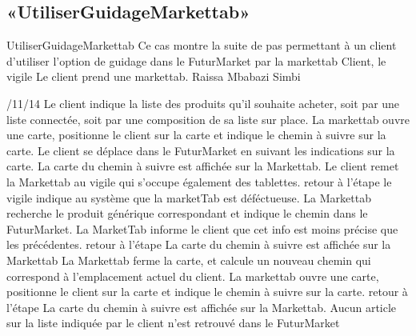 \subsection{«UtiliserGuidageMarkettab»}
\startCU
\nom UtiliserGuidageMarkettab
\but Ce cas montre la suite de pas permettant à un client d'utiliser l'option de guidage dans le FuturMarket par la markettab
\acteur Client, le vigile
\precondition Le client prend une markettab.
\auteur Raissa Mbabazi Simbi
\date 7/11/14
\nominal %
\startnominal
{} Le client indique la liste des produits qu'il souhaite acheter, soit par une liste connectée, soit par une composition de sa liste sur place.
\etape[UGM:SE1] La markettab ouvre une carte, positionne le client sur la carte et indique le chemin à suivre sur la carte.
 Le client se déplace dans le FuturMarket en suivant les indications sur la carte.
\stopnominal
\postcondition La carte du chemin à suivre est affichée sur la Markettab.
\alternatifs
{}
\etape Le client remet la Markettab au vigile qui s'occupe également des tablettes.
\etape retour à l'étape 
\stopcondition
\postcondition le vigile indique au système que la marketTab est déféctueuse.
\stopalternatif
\startalternatif[UGM:SE1]
\etape La Markettab recherche le produit générique correspondant et indique le chemin dans le FuturMarket. La MarketTab informe le client que cet info est moins précise que les précédentes.
\etape retour à l'étape 
\stopcondition
\postcondition La carte du chemin à suivre est affichée sur la Markettab
\stopalternatif
\startalternatif[UGM:SE1]
\etape La Markettab ferme la carte, et calcule un nouveau chemin qui correspond à l'emplacement actuel du client. 
\etape La markettab ouvre une carte, positionne le client sur la carte et indique le chemin à suivre sur la carte.
\etape retour à l'étape 
\stopcondition
\postcondition La carte du chemin à suivre est affichée sur la Markettab.
\stopalternatif
\exception
Aucun article sur la liste indiquée par le client n'est retrouvé dans le FuturMarket
\stopCU
